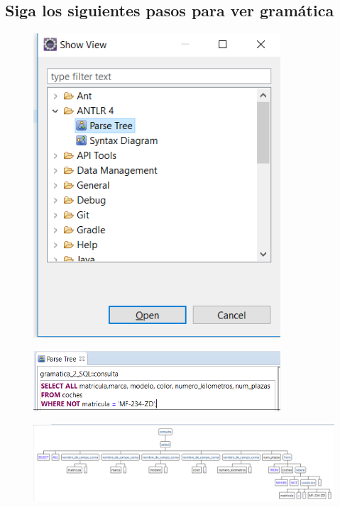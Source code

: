 \documentclass[a4paper,openright,14pt]{report}
\begin{document}
\subsection{Siga los siguientes pasos para ver gram\'atica}
\begin{figure}[htb]
\begin{center}
\includegraphics[width=9.2cm]{imagen14}
\end{center}
\end{figure}
\begin{figure}[htb]
\begin{center}
\includegraphics[width=9.2cm]{imagen15}
\end{center}
\end{figure}
\newpage
\begin{figure}[htb]
\begin{center}
\includegraphics[width=15cm]{imagen16}
\end{center}
\end{figure}
\end{document}
